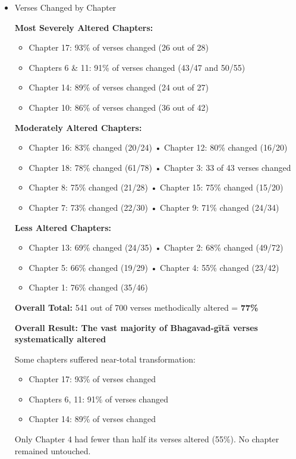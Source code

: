 \documentclass[11pt,twoside]{book}
\begin{document}
\newpage
\begin{itemize}
\item Verses Changed by Chapter
\label{sec:org4ba6aeb}

\textbf{\textbf{Most Severely Altered Chapters:}}
\begin{itemize}
\item Chapter 17: 93\% of verses changed (26 out of 28)
\item Chapters 6 \& 11: 91\% of verses changed (43/47 and 50/55)
\item Chapter 14: 89\% of verses changed (24 out of 27)
\item Chapter 10: 86\% of verses changed (36 out of 42)
\end{itemize}

\textbf{\textbf{Moderately Altered Chapters:}}
\begin{itemize}
\item Chapter 16: 83\% changed (20/24) • Chapter 12: 80\% changed (16/20)
\item Chapter 18: 78\% changed (61/78) • Chapter 3: 33 of 43 verses changed
\item Chapter 8: 75\% changed (21/28) • Chapter 15: 75\% changed (15/20)
\item Chapter 7: 73\% changed (22/30) • Chapter 9: 71\% changed (24/34)
\end{itemize}

\textbf{\textbf{Less Altered Chapters:}}
\begin{itemize}
\item Chapter 13: 69\% changed (24/35) • Chapter 2: 68\% changed (49/72)
\item Chapter 5: 66\% changed (19/29) • Chapter 4: 55\% changed (23/42)
\item Chapter 1: 76\% changed (35/46)
\end{itemize}

\textbf{\textbf{Overall Total:}} 541 out of 700 verses methodically altered = \textbf{\textbf{77\%}}

\textbf{\textbf{\textbf{Overall Result: The vast majority of Bhagavad-gītā verses systematically altered}}}

Some chapters suffered near-total transformation:
\begin{itemize}
\item Chapter 17: 93\% of verses changed
\item Chapters 6, 11: 91\% of verses changed
\item Chapter 14: 89\% of verses changed
\end{itemize}

Only Chapter 4 had fewer than half its verses altered (55\%). No chapter remained untouched.
\end{itemize}
\end{document}
